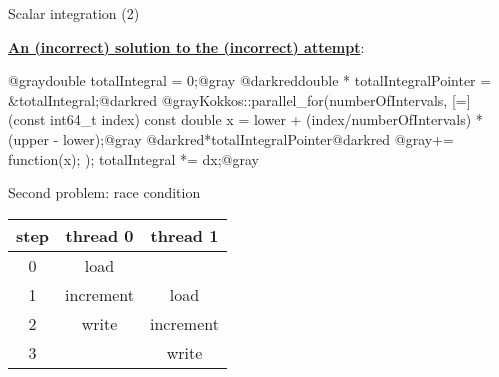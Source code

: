 
\begin{frame}[fragile]{Scalar integration (2)}

  \textbf{\ul{An (incorrect) solution to the (incorrect) attempt}}:

  \vspace{5pt}

  \begin{code}[linebackgroundcolor={
      },
      frame=single
    ]
@graydouble totalIntegral = 0;@gray
@darkreddouble * totalIntegralPointer = &totalIntegral;@darkred
@grayKokkos::parallel_for(numberOfIntervals,
  [=] (const int64_t index) {
    const double x =
      lower + (index/numberOfIntervals) * (upper - lower);@gray
    @darkred*totalIntegralPointer@darkred @gray+= function(x);}
  );
totalIntegral *= dx;@gray
  \end{code}

  \pause
  \vspace{5pt}

  {\color{red}Second problem}: race condition

  \vspace{-7pt}

  \begin{center}
  \begin{tabular}{| c | c | c |}
    \hline
    step & thread 0 & thread 1 \\
    \hline
    0 & load & \\
    \hline
    1 & increment & load \\
    \hline
    2 & write & increment \\
    \hline
    3 & & write \\
    \hline
  \end{tabular}
  \end{center}

  \vspace{-7pt}

\end{frame}


